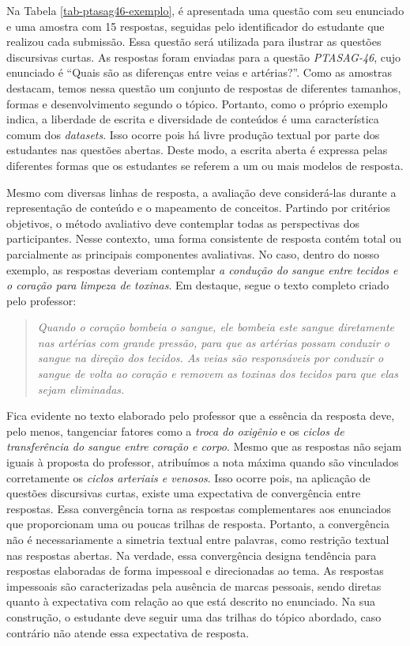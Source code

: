 Na Tabela \ref{tab-ptasag46-exemplo}, é apresentada uma questão com seu enunciado e uma amostra com 15 respostas, seguidas pelo identificador do estudante que realizou cada submissão. Essa questão será utilizada para ilustrar as questões discursivas curtas. As respostas foram enviadas para a questão \textit{PTASAG-46}, cujo enunciado é ``Quais são as diferenças entre veias e artérias?''. Como as amostras destacam, temos nessa questão um conjunto de respostas de diferentes tamanhos, formas e desenvolvimento segundo o tópico. Portanto, como o próprio exemplo indica, a liberdade de escrita e diversidade de conteúdos é uma característica comum dos \textit{datasets}. Isso ocorre pois há livre produção textual por parte dos estudantes nas questões abertas. Deste modo, a escrita aberta é expressa pelas diferentes formas que os estudantes se referem a um ou mais modelos de resposta. 

Mesmo com diversas linhas de resposta, a avaliação deve considerá-las durante a representação de conteúdo e o mapeamento de conceitos. Partindo por critérios objetivos, o método avaliativo deve contemplar todas as perspectivas dos participantes. Nesse contexto, uma forma consistente de resposta contém total ou parcialmente as principais componentes avaliativas. No caso, dentro do nosso exemplo, as respostas deveriam contemplar \textit{a condução do sangue entre tecidos e o coração para limpeza de toxinas}. Em destaque, segue o texto completo criado pelo professor: 

\begin{quote}
\textit{Quando o coração bombeia o sangue, ele bombeia este sangue diretamente nas artérias com grande pressão, para que as artérias possam conduzir o sangue na direção dos tecidos. As veias são responsáveis por conduzir o sangue de volta ao coração e removem as toxinas dos tecidos para que elas sejam eliminadas.}
\end{quote}

Fica evidente no texto elaborado pelo professor que a essência da resposta deve, pelo menos, tangenciar fatores como a \textit{troca do oxigênio} e os \textit{ciclos de transferência do sangue entre coração e corpo}. Mesmo que as respostas não sejam iguais à proposta do professor, atribuímos a nota máxima quando são vinculados corretamente os \textit{ciclos arteriais e venosos}. Isso ocorre pois, na aplicação de questões discursivas curtas, existe uma expectativa de convergência entre respostas. Essa convergência torna as respostas complementares aos enunciados que proporcionam uma ou poucas trilhas de resposta. Portanto, a convergência não é necessariamente a simetria textual entre palavras, como restrição textual nas respostas abertas. Na verdade, essa convergência designa tendência para respostas elaboradas de forma impessoal e direcionadas ao tema. As respostas impessoais são caracterizadas pela ausência de marcas pessoais, sendo diretas quanto à expectativa com relação ao que está descrito no enunciado. Na sua construção, o estudante deve seguir uma das trilhas do tópico abordado, caso contrário não atende essa expectativa de resposta.

